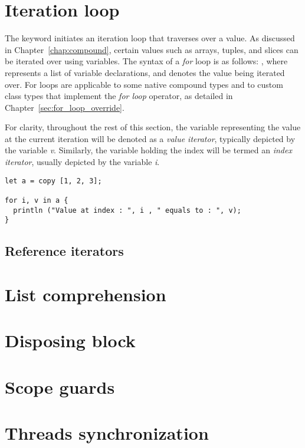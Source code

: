 \section{Iteration loop}%
\label{sec:for_loop}

The keyword  initiates an iteration loop that traverses over a value.
As discussed in Chapter~\ref{chap:compound}, certain values such as arrays,
tuples, and slices can be iterated over using variables. The syntax of a
\textit{for} loop is as follows: , where  represents a list of variable declarations, and  denotes the
value being iterated over. For loops are applicable to some native compound
types and to custom class types that implement the \textit{for loop} operator,
as detailed in Chapter~\ref{sec:for_loop_override}.

For clarity, throughout the rest of this section, the variable representing the
value at the current iteration will be denoted as a \textit{value iterator},
typically depicted by the variable \textit{v}. Similarly, the variable holding
the index will be termed an \textit{index iterator}, usually depicted by the
variable \textit{i}.

\begin{lstlisting}[style=coloredverbatim]
let a = copy [1, 2, 3];

for i, v in a {
  println ("Value at index : ", i , " equals to : ", v);
}
\end{lstlisting}

\subsection{Reference iterators}

\section{List comprehension}%
\label{sec:list_compr}

\section{Disposing block}%
\label{sec:with_block}

\section{Scope guards}%
\label{sec:scope_guards}

\section{Threads synchronization}
